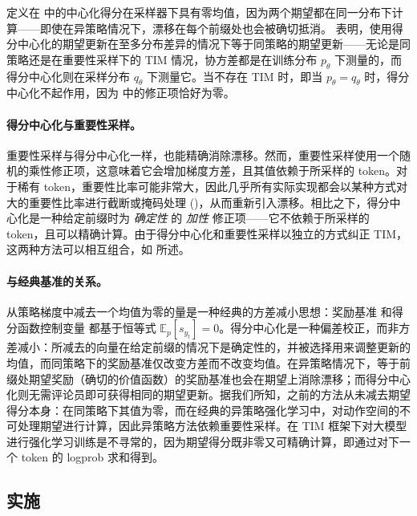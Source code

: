 定义在  中的中心化得分在采样器下具有零均值，因为两个期望都在同一分布下计算——即使在异策略情况下，漂移在每个前缀处也会被确切抵消。 表明，使用得分中心化的期望更新在至多分布差异的情况下等于同策略的期望更新——无论是同策略还是在重要性采样下的 TIM 情况，协方差都是在训练分布 $p_\theta$ 下测量的，而得分中心化则在采样分布 $q_\theta$ 下测量它。当不存在 TIM 时，即当 $p_\theta = q_\theta$ 时，得分中心化不起作用，因为  中的修正项恰好为零。

\paragraph{得分中心化与重要性采样。} 重要性采样与得分中心化一样，也能精确消除漂移。然而，重要性采样使用一个随机的乘性修正项，这意味着它会增加梯度方差，且其值依赖于所采样的 token。对于稀有 token，重要性比率可能非常大，因此几乎所有实际实现都会以某种方式对大的重要性比率进行截断或掩码处理 ()，从而重新引入漂移。相比之下，得分中心化是一种给定前缀时为 \textit{确定性} 的 \textit{加性} 修正项——它不依赖于所采样的 token，且可以精确计算。由于得分中心化和重要性采样以独立的方式纠正 TIM，这两种方法可以相互组合，如  所述。

\paragraph{与经典基准的关系。} 从策略梯度中减去一个均值为零的量是一种经典的方差减小思想：奖励基准 \citep{reinforce} 和得分函数控制变量 \citep{bbvi} 都基于恒等式 $\mathbb{E}_p[s_{y_t}] = 0$。得分中心化是一种偏差校正，而非方差减小：所减去的向量在给定前缀的情况下是确定性的，并被选择用来调整更新的均值，而同策略下的奖励基准仅改变方差而不改变均值。在异策略情况下，等于前缀处期望奖励（确切的价值函数）的奖励基准也会在期望上消除漂移；而得分中心化则无需评论员即可获得相同的期望更新。据我们所知，之前的方法从未减去期望得分本身：在同策略下其值为零，而在经典的异策略强化学习中，对动作空间的不可处理期望进行计算，因此异策略方法依赖重要性采样。在 TIM 框架下对大模型进行强化学习训练是不寻常的，因为期望得分既非零又可精确计算，即通过对下一个 token 的 logprob 求和得到。

\subsection{实施}
\label{sec:sc_impl}

